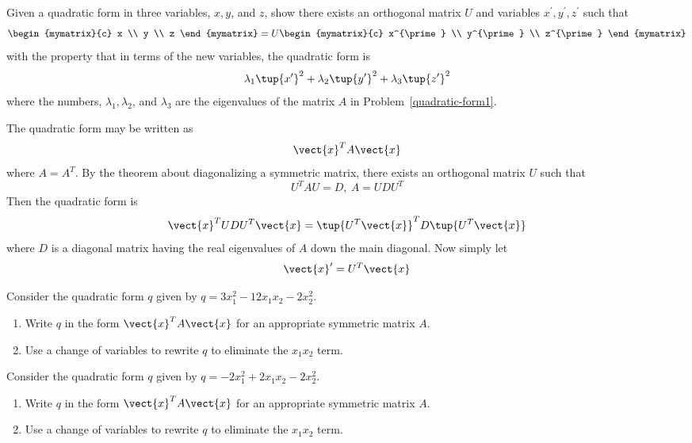 \begin{enumialphparenastyle}
\begin{ex} Given a quadratic form in three variables, $x,y$, and $z$, show there
exists an orthogonal matrix $U$ and variables $x^{\prime },y^{\prime
},z^{\prime }$ such that 
\begin{equation*}
\begin{mymatrix}{c}
x \\ 
y \\ 
z
\end{mymatrix} =U\begin{mymatrix}{c}
x^{\prime } \\ 
y^{\prime } \\ 
z^{\prime }
\end{mymatrix}
\end{equation*}
with the property that in terms of the new variables, the quadratic form is 
\begin{equation*}
\lambda _{1}\tup{x^{\prime }} ^{2}+\lambda _{2}\tup{y^{\prime
}} ^{2}+\lambda _{3}\tup{z^{\prime }} ^{2}
\end{equation*}
where the numbers, $\lambda _{1},\lambda _{2}$, and $\lambda _{3}$ are the
eigenvalues of the matrix $A$ in Problem~\ref{quadratic-form1}. 
\begin{sol}
The quadratic form
may be written as
\[
\vect{x}^{T}A\vect{x}
\]
where $A=A^{T}$. By the theorem about diagonalizing a symmetric matrix,
there exists an orthogonal matrix $U$ such that
\[
U^{T}AU=D,\ A=UDU^{T}
\]
Then the quadratic form is
\[
\vect{x}^{T}UDU^{T}\vect{x}=\tup{U^{T}\vect{x}} ^{T}D\tup{
U^{T}\vect{x}}
\]
where $D$ is a diagonal matrix having the real eigenvalues of $A$ down the
main diagonal. Now simply let
\[
\vect{x}^{\prime } =  U^{T}\vect{x}
\]
\end{sol}
\end{ex}

\begin{ex} Consider the quadratic form $q$ given by $q = 3x_1^2 -12x_1x_2 - 2x_2^2$.\begin{enumerate}
\item Write $q$ in the form $\vect{x}^TA\vect{x}$ for an appropriate symmetric matrix $A$.
\item Use a change of variables to rewrite $q$ to eliminate the $x_1x_2$ term. 
\end{enumerate}
\end{ex}

\begin{ex} Consider the quadratic form $q$ given by $q = -2x_1^2 + 2x_1x_2 - 2x_2^2$.
\begin{enumerate}
\item Write $q$ in the form $\vect{x}^TA\vect{x}$ for an appropriate symmetric matrix $A$.
\item Use a change of variables to rewrite $q$ to eliminate the $x_1x_2$ term. 
\end{enumerate}
\end{ex}


\end{enumialphparenastyle}
